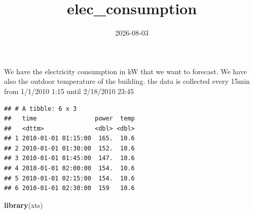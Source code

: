 \documentclass[
]{article}
\title{elec\_consumption}
\author{}
\date{\vspace{-2.5em}2026-08-03}
\newenvironment{Shaded}{\begin{snugshade}}{\end{snugshade}}
\newcommand{\AttributeTok}[1]{\textcolor[rgb]{0.13,0.29,0.53}{#1}}
\newcommand{\CommentTok}[1]{\textcolor[rgb]{0.56,0.35,0.01}{\textit{#1}}}
\newcommand{\FunctionTok}[1]{\textcolor[rgb]{0.13,0.29,0.53}{\textbf{#1}}}
\newcommand{\NormalTok}[1]{#1}
\newcommand{\OtherTok}[1]{\textcolor[rgb]{0.56,0.35,0.01}{#1}}
\newcommand{\SpecialCharTok}[1]{\textcolor[rgb]{0.81,0.36,0.00}{\textbf{#1}}}
\newcommand{\StringTok}[1]{\textcolor[rgb]{0.31,0.60,0.02}{#1}}
\begin{document}
\maketitle

We have the electricity consumption in kW that we want to forecast. We
have also the outdoor temperature of the building. the data is collected
every 15min from 1/1/2010 1:15 until 2/18/2010 23:45

\begin{Shaded}
\end{Shaded}

\begin{verbatim}
## # A tibble: 6 x 3
##   time                power  temp
##   <dttm>              <dbl> <dbl>
## 1 2010-01-01 01:15:00  165.  10.6
## 2 2010-01-01 01:30:00  152.  10.6
## 3 2010-01-01 01:45:00  147.  10.6
## 4 2010-01-01 02:00:00  154.  10.6
## 5 2010-01-01 02:15:00  154.  10.6
## 6 2010-01-01 02:30:00  159   10.6
\end{verbatim}

\begin{Shaded}
\begin{Highlighting}[]
\FunctionTok{library}\NormalTok{(xts)}
\end{Highlighting}
\end{Shaded}
\end{document}

